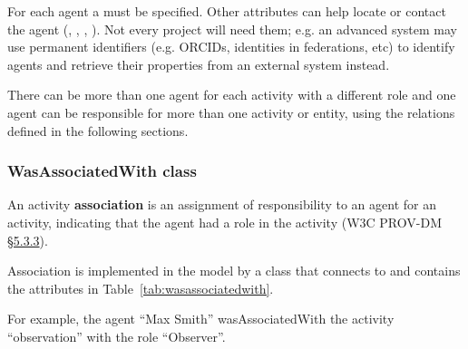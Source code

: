
For each agent a  must be specified. 
Other attributes can help locate or contact the agent (, , , ). 
Not every project will need them; e.g. an advanced system may use permanent identifiers (e.g. ORCIDs, identities in federations, etc) to identify agents and retrieve their properties from an external system instead.

There can be more than one agent for each activity with a different role and one agent can be responsible for more than one activity or entity, using the relations defined in the following sections.


\subsubsection{WasAssociatedWith class}

An activity \textbf{association} is an assignment of responsibility to an agent for an activity, indicating that the agent had a role in the activity (W3C PROV-DM \href{https://www.w3.org/TR/prov-dm/#term-Association}{\S5.3.3}).

Association is implemented in the model by a class  that connects  to  and contains the attributes in Table~\ref{tab:wasassociatedwith}.

For example, the agent ``Max Smith'' wasAssociatedWith the activity ``observation'' with the role ``Observer''.


